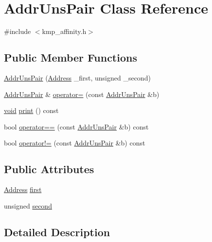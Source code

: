 \hypertarget{classAddrUnsPair}{\section{Addr\-Uns\-Pair Class Reference}
\label{classAddrUnsPair}
}


{\ttfamily \#include $<$kmp\-\_\-affinity.\-h$>$}

\subsection*{Public Member Functions}
\begin{DoxyCompactItemize}
\item 
\hyperlink{classAddrUnsPair_a736ff51c6208c74083b8dc42bd8b5123}{Addr\-Uns\-Pair} (\hyperlink{classAddress}{Address} \-\_\-first, unsigned \-\_\-second)
\item 
\hyperlink{classAddrUnsPair}{Addr\-Uns\-Pair} \& \hyperlink{classAddrUnsPair_a6659b3fd1bd2ffe14a199b39305a2b69}{operator=} (const \hyperlink{classAddrUnsPair}{Addr\-Uns\-Pair} \&b)
\item 
\hyperlink{ittnotify__static_8h_af941d56e55e3c5465135b60c4d6343ed}{void} \hyperlink{classAddrUnsPair_a78d8695fcf76acb6765a6ee1676275a0}{print} () const 
\item 
bool \hyperlink{classAddrUnsPair_ac783e94c518d64ca6f5df1a8a9a437fc}{operator==} (const \hyperlink{classAddrUnsPair}{Addr\-Uns\-Pair} \&b) const 
\item 
bool \hyperlink{classAddrUnsPair_acf8951d00c9ba46651bda36c73541928}{operator!=} (const \hyperlink{classAddrUnsPair}{Addr\-Uns\-Pair} \&b) const 
\end{DoxyCompactItemize}
\subsection*{Public Attributes}
\begin{DoxyCompactItemize}
\item 
\hyperlink{classAddress}{Address} \hyperlink{classAddrUnsPair_a982f64b113d22417f89b279ec24f097e}{first}
\item 
unsigned \hyperlink{classAddrUnsPair_afba7fb1f72a6e49d8024dc37c0bacf1a}{second}
\end{DoxyCompactItemize}


\subsection{Detailed Description}


